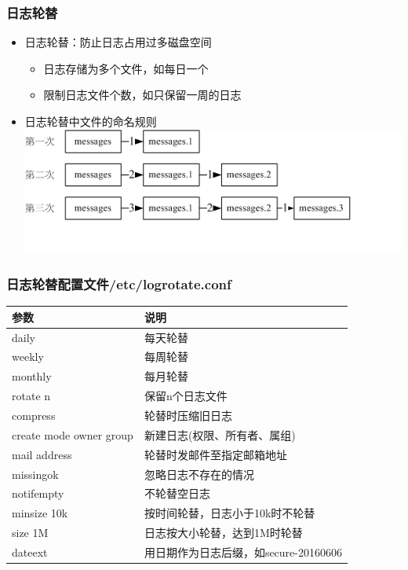 \documentclass[xcolor=svgnames,presentation]{beamer}
\begin{document}
\begin{frame}
\frametitle{日志轮替}
\label{sec-6-9}
\begin{itemize}

\item 日志轮替：防止日志占用过多磁盘空间
\label{sec-6-9-1}%
\begin{itemize}

\item 日志存储为多个文件，如每日一个
\label{sec-6-9-1-1}%

\item 限制日志文件个数，如只保留一周的日志
\label{sec-6-9-1-2}%
\end{itemize} %

\item 日志轮替中文件的命名规则\\
\label{sec-6-9-2}%
\includegraphics[width=.9\linewidth]{img/logrotate.png}
\end{itemize} %
\end{frame}
\begin{frame}
\frametitle{日志轮替配置文件/etc/logrotate.conf}
\label{sec-6-10}


\begin{center}
\begin{tabular}{ll}
 参数                     &  说明                                   \\
\hline
 daily                    &  每天轮替                               \\
 weekly                   &  每周轮替                               \\
 monthly                  &  每月轮替                               \\
 rotate n                 &  保留n个日志文件                        \\
 compress                 &  轮替时压缩旧日志                       \\
 create mode owner group  &  新建日志(权限、所有者、属组)           \\
 mail address             &  轮替时发邮件至指定邮箱地址             \\
 missingok                &  忽略日志不存在的情况                   \\
 notifempty               &  不轮替空日志                           \\
 minsize 10k              &  按时间轮替，日志小于10k时不轮替        \\
 size 1M                  &  日志按大小轮替，达到1M时轮替           \\
 dateext                  &  用日期作为日志后缀，如secure-20160606  \\
\end{tabular}
\end{center}
\end{frame}
\end{document}
